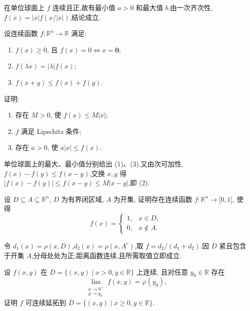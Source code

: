 \begin{solution}
    在单位球面上 $f$ 连续且正,故有最小值 $a>0$ 和最大值 $b$.由一次齐次性,$f(x)=|x|f(x/|x|)$,结论成立.
\end{solution}

\begin{example}[\markstar]
    设连续函数 $f:\mathbb{R}^n\to\mathbb{R}$ 满足:
    \begin{enumerate}[label=(\roman*)]
        \item $f(x)\geq0$, 且 $f(x)=0\iff x=\bm{0}$;
        \item $f(\lambda x)=|\lambda|f(x)$;
        \item $f(x+y)\leq f(x)+f(y)$.
    \end{enumerate}
    证明:
    \begin{enumerate}
        \item 存在 $M>0$, 使 $f(x)\leq M|x|$;
        \item $f$ 满足 Lipschitz 条件;
        \item 存在 $a>0$, 使 $a|x|\leq f(x)$.
    \end{enumerate}
\end{example}
\exampleblank

\begin{solution}
    单位球面上的最大、最小值分别给出 (1)、(3).又由次可加性,$f(x)-f(y)\leq f(x-y)$,交换 $x,y$ 得 $|f(x)-f(y)|\leq f(x-y)\leq M|x-y|$,即 (2).
\end{solution}

\begin{example}
    设 $D\subseteq A\subseteq\mathbb{R}^n$, $D$ 为有界闭区域, $A$ 为开集, 证明存在连续函数 $f:\mathbb{R}^n\to\lbrack0,1\rbrack$, 使得
    \[
        f(x)=
        \begin{cases}
            1, & x\in D,    \\
            0, & x\notin A.
        \end{cases}
    \]
\end{example}
\exampleblank

\begin{solution}
    令 $d_1(x)=\rho(x,D)$,$d_2(x)=\rho(x,A^c)$,取 $f=d_2/(d_1+d_2)$.因 $D$ 紧且包含于开集 $A$,分母处处为正;距离函数连续,且所需取值立即成立.
\end{solution}

\begin{example}
    设 $f(x,y)$ 在 $D=\{(x,y)\mid x>0,y\in\mathbb{R}\}$ 上连续, 且对任意 $y_0\in\mathbb{R}$ 存在
    \[
        \lim\limits_{\substack{x\to0^+\\y\to y_0}}f(x,y)=\varphi(y_0),
    \]
    证明 $f$ 可连续延拓到 $\overline D=\{(x,y)\mid x\geq0,y\in\mathbb{R}\}$.
\end{example}
\exampleblank

